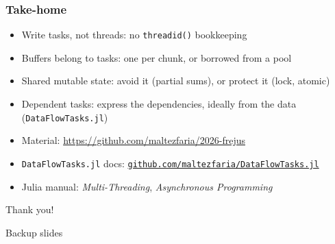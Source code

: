 \documentclass{beamer}
\newcommand{\DFT}{\texttt{DataFlowTasks.jl}}
\begin{document}
\begin{frame}
	\frametitle{Take-home}
	\begin{itemize}
		\item Write \alert{tasks}, not threads: no \texttt{threadid()} bookkeeping
		\item Buffers belong to tasks: one per chunk, or borrowed from a pool
		\item Shared mutable state: avoid it (partial sums), or protect it (lock, atomic)
		\item Dependent tasks: express the dependencies, ideally \alert{from the data} (\DFT)
	\end{itemize}

	\vfill
	\begin{itemize}
		\item Material: \url{https://github.com/maltezfaria/2026-frejus}
		\item \DFT{} docs: \href{https://github.com/maltezfaria/DataFlowTasks.jl}{\texttt{github.com/maltezfaria/DataFlowTasks.jl}}
		\item Julia manual: \textit{Multi-Threading}, \textit{Asynchronous Programming}
	\end{itemize}

	\vfill
	\centering\Large Thank you!
\end{frame}

\appendix

\begin{frame}[plain]
	\centering\Huge\color{structure} Backup slides
\end{frame}
\end{document}
